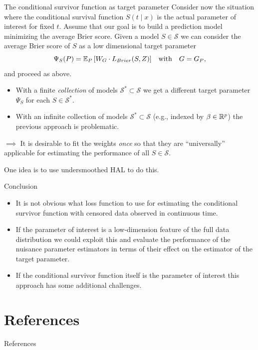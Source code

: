 \documentclass[smaller]{beamer}\usepackage{listings}
\begin{document}
\begin{frame}[label={sec:orgeef836c}]{The conditional survivor function as target parameter}
\small Consider now the situation where the conditional survival function \(S(t \mid x)\) is the
actual parameter of interest for fixed \(t\). Assume that our goal is to build a prediction model
minimizing the average Brier score. Given a model \(S \in \mathcal{S}\) we can consider the average
Brier score of \(S\) as a low dimensional target parameter
\begin{equation*}
  \Psi_S(P) = \operatorname{\mathbb{E}}_P{\left[ W_G \cdot L_{Brier}(S, Z) \right]}
  \quad \text{with} \quad G = G_P,
\end{equation*}
and proceed as above. \pause

\begin{itemize}
\item With a finite \emph{collection} of models \(\mathcal{S}^* \subset \mathcal{S}\) we get a different target parameter
\(\Psi_S\) for each \(S \in\mathcal{S}^*\). \pause
\item With an infinite collection of models \(\mathcal{S}^* \subset \mathcal{S}\) (e.g., indexed by
\(\beta \in \mathbb{R}^p\)) the previous approach is problematic. \pause
\end{itemize}

\(\implies\) It is desirable to fit the weights \emph{once} so that they are ``universally''
applicable for estimating the performance of all \(S \in \mathcal{S}\).

\vfill

One idea is to use undersmoothed HAL to do this.
\end{frame}

\begin{frame}[label={sec:org6108e41}]{Conclusion}
\begin{itemize}
\item It is not obvious what loss function to use for estimating the conditional survivor function with
censored data observed in continuous time.
\item If the parameter of interest is a low-dimension feature of the full data distribution we could
exploit this and evaluate the performance of the nuisance parameter estimators in terms of their
effect on the estimator of the target parameter.
\item If the conditional survivor function itself is the parameter of interest this approach has some
additional challenges.
\end{itemize}
\end{frame}

\section*{References}
\label{sec:org38c336e}
\begin{frame}[label={sec:org35980a9}]{References}
\footnotesize 
\end{frame}
\end{document}
